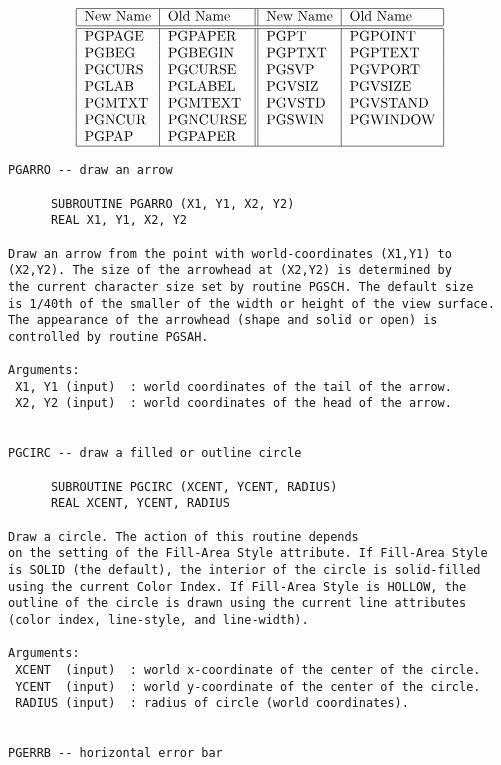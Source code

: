 \begin{itemize}
\[\begin{tabular}{|l|l||l|l|}\hline
New Name &Old Name& New Name &Old Name \\\hline\hline
PGPAGE &PGPAPER &PGPT &PGPOINT \\
PGBEG  &PGBEGIN &PGPTXT &PGPTEXT \\
PGCURS &PGCURSE &PGSVP &PGVPORT \\
PGLAB  &PGLABEL &PGVSIZ &PGVSIZE \\
PGMTXT &PGMTEXT &PGVSTD &PGVSTAND \\
PGNCUR &PGNCURSE &PGSWIN &PGWINDOW \\
PGPAP  &PGPAPER & & \\\hline
\end{tabular}\]

\end{itemize}
\newpage
\begin{small}
\begin{verbatim}
PGARRO -- draw an arrow

      SUBROUTINE PGARRO (X1, Y1, X2, Y2)
      REAL X1, Y1, X2, Y2

Draw an arrow from the point with world-coordinates (X1,Y1) to
(X2,Y2). The size of the arrowhead at (X2,Y2) is determined by
the current character size set by routine PGSCH. The default size
is 1/40th of the smaller of the width or height of the view surface.
The appearance of the arrowhead (shape and solid or open) is
controlled by routine PGSAH.

Arguments:
 X1, Y1 (input)  : world coordinates of the tail of the arrow.
 X2, Y2 (input)  : world coordinates of the head of the arrow.


PGCIRC -- draw a filled or outline circle

      SUBROUTINE PGCIRC (XCENT, YCENT, RADIUS)
      REAL XCENT, YCENT, RADIUS

Draw a circle. The action of this routine depends
on the setting of the Fill-Area Style attribute. If Fill-Area Style
is SOLID (the default), the interior of the circle is solid-filled
using the current Color Index. If Fill-Area Style is HOLLOW, the
outline of the circle is drawn using the current line attributes
(color index, line-style, and line-width).

Arguments:
 XCENT  (input)  : world x-coordinate of the center of the circle.
 YCENT  (input)  : world y-coordinate of the center of the circle.
 RADIUS (input)  : radius of circle (world coordinates).


PGERRB -- horizontal error bar


\end{verbatim}
\end{small}
